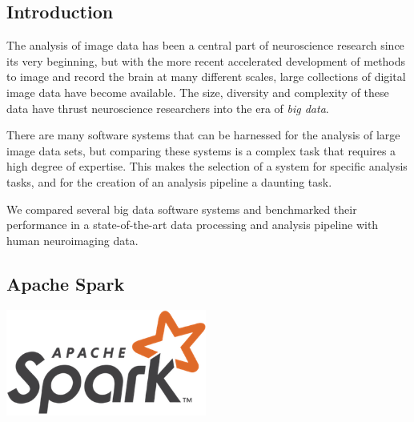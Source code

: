 \documentclass[a0,landscape]{a0poster}
\begin{document}
\vspace{0.5cm} %


\begin{multicols}{3} %


\section*{Introduction}

The analysis of image data has been a central part of neuroscience research
since its very beginning, but with the more recent accelerated development of
methods to image and record the brain at many different scales, large
collections of digital image data have become available. The size, diversity and
complexity of these data have thrust neuroscience researchers into the era of
\emph{big data}.

There are many software systems that can be harnessed for the analysis of large
image data sets, but comparing these systems is a complex task that requires a
high degree of expertise. This makes the selection of a system for specific
analysis tasks, and for the creation of an analysis pipeline a daunting task.

\color{Navy}

We compared several big data software systems and benchmarked their performance
in a state-of-the-art data processing and analysis pipeline with human
neuroimaging data.

\color{DarkSlateGray}

\begin{minipage}[b]{0.75\linewidth}
  \subsection*{Apache Spark}
\end{minipage}
\begin{minipage}[b]{0.25\linewidth}
  \includegraphics[height=3.5cm]{spark-logo.png}
\end{minipage}


\end{multicols}
\end{document}
